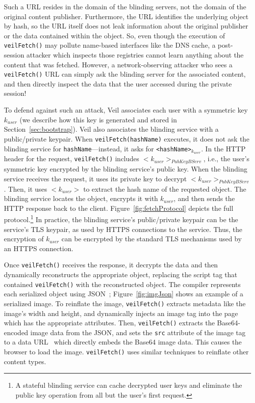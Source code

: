 Such a URL resides in the domain of the blinding
servers, not the domain of the original content
publisher. Furthermore, the URL identifies the underlying
object by hash, so the URL itself does not leak
information about the original publisher or the data
contained within the object. So, even though the
execution of \texttt{veilFetch()} may pollute
name-based interfaces like the DNS cache, a post-session
attacker which inspects those registries
cannot learn anything about the content that was fetched.
However, a network-observing attacker who sees a
\texttt{veilFetch()} URL can simply ask the blinding
server for the associated content, and then directly
inspect the data that the user accessed during the
private session!

To defend against such an attack, Veil associates
each user with a symmetric key $k_{user}$ (we describe
how this key is generated and stored in
Section~\ref{sec:bootstrap}). Veil also associates the
blinding service with a public/private keypair. When
\texttt{veilFetch(hashName)} executes, it does not
ask the blinding service for \texttt{hashName}---instead,
it asks for \texttt{<hashName>}$_{k_{user}}$. In the
HTTP header for the request, \texttt{veilFetch()} includes
$<k_{user}>_{PubKeyBServ}$, i.e., the user's symmetric
key encrypted by the blinding service's public key.
When the blinding service receives the request,
it uses its private key to decrypt $<k_{user}>_{PubKeyBServ}$.
Then, it uses $<k_{user}>$ to extract the hash
name of the requested object. The blinding service
locates the object, encrypts it with $k_{user}$,
and then sends the HTTP response back to the
client. Figure~\ref{fig:fetchProtocol} depicts
the full protocol.\footnote{%
	A stateful blinding service can cache decrypted
	user keys and eliminate the public key operation
	from all but the user's first request.} In practice,
the blinding service's public/private
keypair can be the service's TLS keypair, as used
by HTTPS connections to the service. Thus, the
encryption of $k_{user}$ can be encrypted by the
standard TLS mechanisms used by an HTTPS connection.

Once \texttt{veilFetch()} receives the response,
it decrypts the data and then dynamically
reconstructs the appropriate object, replacing
the script tag that contained \texttt{veilFetch()}
with the reconstructed object. The compiler
represents each serialized object using JSON~\cite{json};
Figure~\ref{fig:imgJson} shows an example
of a serialized image. To reinflate
the image, \texttt{veilFetch()} extracts
metadata like the image's width and height,
and dynamically injects an image tag into
the page which has the appropriate attributes.
Then, \texttt{veilFetch()} extracts the
Base64-encoded image data from the JSON,
and sets the \texttt{src} attribute
of the image tag to a data URL~\cite{dataUrl}
which directly embeds the Base64 image
data. This causes the browser to load the
image. \texttt{veilFetch()} uses similar
techniques to reinflate other content types.

